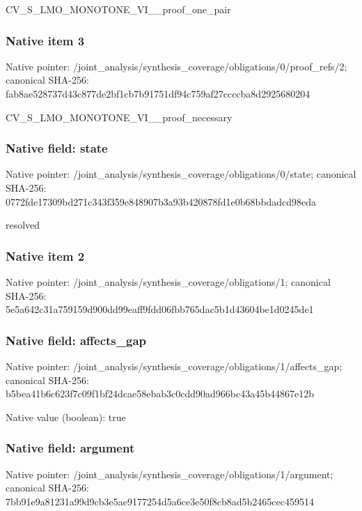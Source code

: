 \documentclass[10pt,a4paper]{article}
\begin{document}
\begingroup\raggedright\sloppy CV\_\allowbreak{}S\_\allowbreak{}LMO\_\allowbreak{}MONOTONE\_\allowbreak{}VI\_\allowbreak{}\_\allowbreak{}proof\_\allowbreak{}one\_\allowbreak{}pair\par\endgroup

\subsubsection{Native item 3}
Native pointer: /joint\_\allowbreak{}analysis/synthesis\_\allowbreak{}coverage/obligations/0/proof\_\allowbreak{}refs/2; canonical SHA-256: fab8ae528737d43c877de2bf1cb7b91751df94c759af27ccccba8d2925680204

\begingroup\raggedright\sloppy CV\_\allowbreak{}S\_\allowbreak{}LMO\_\allowbreak{}MONOTONE\_\allowbreak{}VI\_\allowbreak{}\_\allowbreak{}proof\_\allowbreak{}necessary\par\endgroup

\subsubsection{Native field: state}
Native pointer: /joint\_\allowbreak{}analysis/synthesis\_\allowbreak{}coverage/obligations/0/state; canonical SHA-256: 0772fde17309bd271c343f359e848907b3a93b420878fd1e0b68bbdadcd98eda

\begingroup\raggedright\sloppy resolved\par\endgroup

\subsubsection{Native item 2}
Native pointer: /joint\_\allowbreak{}analysis/synthesis\_\allowbreak{}coverage/obligations/1; canonical SHA-256: 5e5a642c31a759159d900dd99eaff9fdd06fbb765dac5b1d43604be1d0245de1

\subsubsection{Native field: affects\_\allowbreak{}gap}
Native pointer: /joint\_\allowbreak{}analysis/synthesis\_\allowbreak{}coverage/obligations/1/affects\_\allowbreak{}gap; canonical SHA-256: b5bea41b6c623f7c09f1bf24dcae58ebab3c0cdd90ad966bc43a45b44867e12b

Native value (boolean): true

\subsubsection{Native field: argument}
Native pointer: /joint\_\allowbreak{}analysis/synthesis\_\allowbreak{}coverage/obligations/1/argument; canonical SHA-256: 7bb91e9a81231a99d9cb3e5ae9177254d5a6ce3e50f8cb8ad5b2465cec459514
\end{document}

